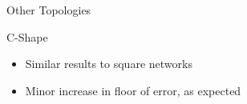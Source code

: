 \documentclass{beamer}
\begin{document}
\begin{frame}{Other Topologies}
\begin{block}{C-Shape}
		\begin{itemize}
			\item Similar results to square networks
			\item Minor increase in floor of error, as expected
		\end{itemize}
		\begin{figure}
			\centering
			~
		\end{figure}
\end{block}	
\end{frame}
\end{document}
